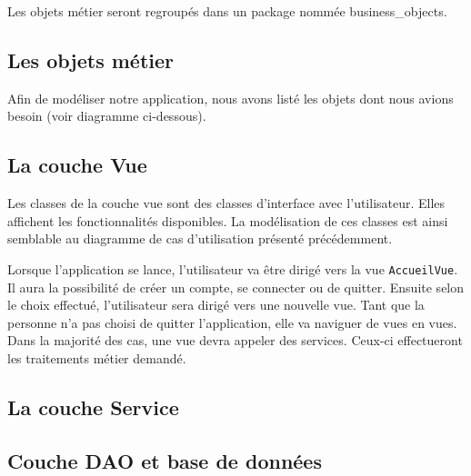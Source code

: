 \documentclass[11pt]{article}
\begin{document}
\bigbreak

Les objets métier seront regroupés dans un package nommée business\_objects.


\subsection{Les objets métier}

Afin de modéliser notre application, nous avons listé les objets dont nous avions besoin (voir diagramme ci-dessous).



\subsection{La couche Vue}

Les classes de la couche vue sont des classes d'interface avec l'utilisateur. Elles affichent les fonctionnalités disponibles. La modélisation de ces classes est ainsi semblable au diagramme de cas d'utilisation présenté précédemment.

\bigbreak

Lorsque l'application se lance, l'utilisateur va être dirigé vers la vue \texttt{AccueilVue}. Il aura la possibilité de créer un compte, se connecter ou de quitter. Ensuite selon le choix effectué, l'utilisateur sera dirigé vers une nouvelle vue. Tant que la personne n'a pas choisi de quitter l'application, elle va naviguer de vues en vues. Dans la majorité des cas, une vue devra appeler des services. Ceux-ci effectueront les traitements métier demandé.



\subsection{La couche Service}




\subsection{Couche DAO et base de données}





\newpage




\end{document}

